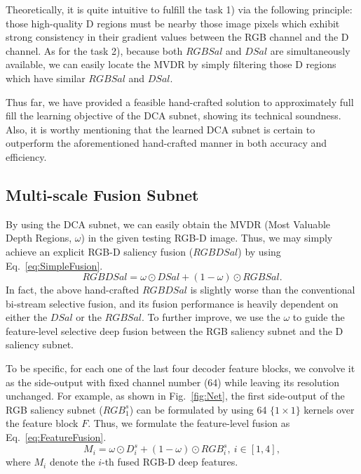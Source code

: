 \documentclass[journal]{IEEEtran}
\begin{document}
Theoretically, it is quite intuitive to fulfill the task 1) via the following principle:
those high-quality D regions must be nearby those image pixels which exhibit strong consistency in their gradient values between the RGB channel and the D channel.
As for the task 2), because both $RGBSal$ and $DSal$ are simultaneously available, we can easily locate the MVDR by simply filtering those D regions which have similar $RGBSal$ and $DSal$.

Thus far, we have provided a feasible hand-crafted solution to approximately full fill the learning objective of the DCA subnet, showing its technical soundness.
Also, it is worthy mentioning that the learned DCA subnet is certain to outperform the aforementioned hand-crafted manner in both accuracy and efficiency.

\subsection{Multi-scale Fusion Subnet}
\label{sec:MSDF}
By using the DCA subnet, we can easily obtain the MVDR (Most Valuable Depth Regions, $\omega$) in the given testing RGB-D image.
Thus, we may simply achieve an explicit RGB-D saliency fusion ($RGBDSal$) by using Eq.~\ref{eq:SimpleFusion}.
\begin{equation}
\label{eq:SimpleFusion}
{RGBDSal} = \omega \odot DSal + (1-\omega) \odot RGBSal.
\end{equation}
In fact, the above hand-crafted $RGBDSal$ is slightly worse than the conventional bi-stream selective fusion, and its fusion performance is heavily dependent on either the $DSal$ or the $RGBSal$.
To further improve, we use the $\omega$ to guide the feature-level selective deep fusion between the RGB saliency subnet and the D saliency subnet.

To be specific, for each one of the last four decoder feature blocks, we convolve it as the side-output with fixed channel number (64) while leaving its resolution unchanged.
For example, as shown in Fig.~\ref{fig:Net}, the first side-output of the RGB saliency subnet ($RGB_{1}^{s}$) can be formulated by using 64 $\{1\times 1\}$ kernels over the feature block $F$.
Thus, we formulate the feature-level fusion as Eq.~\ref{eq:FeatureFusion}.
\begin{equation}
\label{eq:FeatureFusion}
M_i = \omega \odot D_{i}^{s} + (1-\omega) \odot RGB_{i}^{s}, \ i\in[1,4],
\end{equation}
where $M_i$ denote the $i$-th fused RGB-D deep features.
\end{document}
